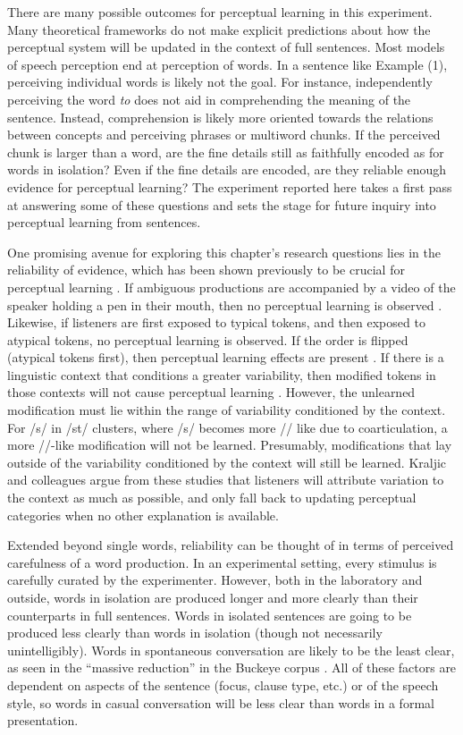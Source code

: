 There are many possible outcomes for perceptual learning in this experiment.
Many theoretical frameworks do not make explicit predictions about how the perceptual system will be updated in the context of full sentences.
Most models of speech perception end at perception of words.
In a sentence like Example (1), perceiving individual words is likely not the goal.
For instance, independently perceiving the word \emph{to} does not aid in comprehending the meaning of the sentence.
Instead, comprehension is likely more oriented towards the relations between concepts and perceiving phrases or multiword chunks.
If the perceived chunk is larger than a word, are the fine details still as faithfully encoded as for words in isolation?
Even if the fine details are encoded, are they reliable enough evidence for perceptual learning?
The experiment reported here takes a first pass at answering some of these questions and sets the stage for future inquiry into perceptual learning from sentences. 

One promising avenue for exploring this chapter's research questions lies in the reliability of evidence, which has been shown previously to be crucial for perceptual learning \citep{Kraljic2008, Kraljic2008a}.
If ambiguous productions are accompanied by a video of the speaker holding a pen in their mouth, then no perceptual learning is observed \citep{Kraljic2008}.
Likewise, if listeners are first exposed to typical tokens, and then exposed to atypical tokens, no perceptual learning is observed.
If the order is flipped (atypical tokens first), then perceptual learning effects are present \citep{Kraljic2008}.
If there is a linguistic context that conditions a greater variability, then modified tokens in those contexts will not cause perceptual learning \citep{Kraljic2008a}.
However, the unlearned modification must lie within the range of variability conditioned by the context.
For /s/ in /st\textturnr/ clusters, where /s/ becomes more /\textesh/ like due to coarticulation, a more /\textesh/-like modification will not be learned.
Presumably, modifications that lay outside of the variability conditioned by the context will still be learned.
Kraljic and colleagues argue from these studies that listeners will attribute variation to the context as much as possible, and only fall back to updating perceptual categories when no other explanation is available.

Extended beyond single words, reliability can be thought of in terms of perceived carefulness of a word production.
In an experimental setting, every stimulus is carefully curated by the experimenter.
However, both in the laboratory and outside, words in isolation are produced longer and more clearly than their counterparts in full sentences.
Words in isolated sentences are going to be produced less clearly than words in isolation (though not necessarily unintelligibly).
Words in spontaneous conversation are likely to be the least clear, as seen in the ``massive reduction'' in the Buckeye corpus \citep{Johnson2004, Dilts2013}.
All of these factors are dependent on aspects of the sentence (focus, clause type, etc.) or of the speech style, so words in casual conversation will be less clear than words in a formal presentation.

